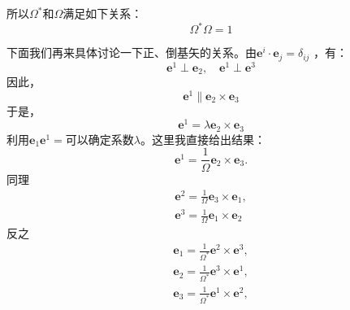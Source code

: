 所以$\Omega^*$和$\Omega$满足如下关系：
\begin{equation}
    \Omega^* \Omega = 1
\end{equation}
\par 下面我们再来具体讨论一下正、倒基矢的关系。由$\boldsymbol{e}^i \cdot \boldsymbol{e}_j = \delta_{ij}$
，有：
\begin{equation}
    \boldsymbol{e}^1\perp \boldsymbol{e}_2, \quad \boldsymbol{e}^1 \perp \boldsymbol{e}^3
\end{equation}
因此，
\begin{equation}
    \boldsymbol{e}^1 \parallel \boldsymbol{e}_2 \times \boldsymbol{e}_3
\end{equation}
于是，
\begin{equation}
    \boldsymbol{e}^1 = \lambda \boldsymbol{e}_2 \times \boldsymbol{e}_3
\end{equation}
利用$\boldsymbol{e}_1 \boldsymbol{e}^1 = $可以确定系数$\lambda$。这里我直接给出结果：
\begin{equation}
    \boldsymbol{e}^1 = \frac{1}{\Omega}\boldsymbol{e}_2 \times \boldsymbol{e}_3.
\end{equation}
同理
\begin{align}
    \boldsymbol{e}^2 = \frac{1}{\Omega}\boldsymbol{e}_3 \times \boldsymbol{e}_1,\\
    \boldsymbol{e}^3 = \frac{1}{\Omega}\boldsymbol{e}_1 \times \boldsymbol{e}_2
\end{align}
反之
\begin{align}
    \boldsymbol{e}_1 = \frac{1}{\Omega^*}\boldsymbol{e}^2 \times \boldsymbol{e}^3 ,\\
    \boldsymbol{e}_2 = \frac{1}{\Omega^*}\boldsymbol{e}^3 \times \boldsymbol{e}^1 ,\\
    \boldsymbol{e}_3 = \frac{1}{\Omega^*}\boldsymbol{e}^1 \times \boldsymbol{e}^2 ,
\end{align}
